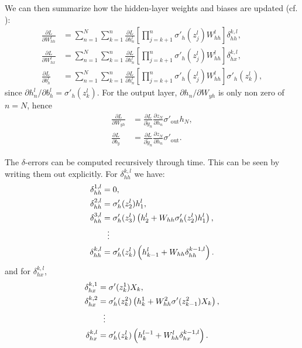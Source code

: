 \documentclass[%
reprint,
amsmath,amssymb,
aps,
]{revtex4-2}
\begin{document}
We can then summarize how the hidden-layer weights and biases are updated (cf. \cite{superGood}):
\begin{subequations}	\label{eq:gradients_hidden}
	\begin{align}
		\frac{\partial L}{\partial W_{hh}^{l}} &= \sum_{n=1}^{N}\sum_{k=1}^{n}\frac{\partial L}{\partial h_{n}^{l}}  \left[ \prod_{j=k+1}^{n} \sigma'_{h}(z_{j}^{l})W_{hh}^{l}\right] \delta^{k,l}_{hh}, \\
		\frac{\partial L}{\partial W_{hx}^{l}} &= \sum_{n=1}^{N}\sum_{k=1}^{n}\frac{\partial L}{\partial h_{n}^{l}}  \left[ \prod_{j=k+1}^{n} \sigma'_{h}(z_{j}^{l})W_{hh}^{l}\right] \delta^{k,l}_{hx}, \\
		\frac{\partial L}{\partial b_{h}^{l}} &= \sum_{n=1}^{N}\sum_{k=1}^{n}\frac{\partial L}{\partial h_{n}^{l}}  \left[ \prod_{j=k+1}^{n} \sigma'_{h}(z_{j}^{l})W_{hh}^{l}\right] \sigma'_{h}(z_k^l),
	\end{align}
\end{subequations}
since \(\partial h^{l}_{n}/\partial b_{h}^{l} = \sigma'_{h}(z_k^l)\). For the output layer, \(\partial h_n/\partial W_{yh}\) is only non zero of \(n=N\), hence
\begin{subequations}	\label{eq:gradients_out}
	\begin{align}
		\frac{\partial L}{\partial W_{yh}} &= \frac{\partial L}{\partial \tilde{y}_{n}} \frac{\partial z_N}{\partial h_{n}} \sigma'_{\text{out}} h_{N}, \\
		\frac{\partial L}{\partial b_{y}} &= \frac{\partial L}{\partial \tilde{y}_{n}} \frac{\partial z_N}{\partial h_{n}} \sigma'_{\text{out}}.
	\end{align}
\end{subequations}

The \(\delta\)-errors can be computed recursively through time. This can be seen by writing them out explicitly. For \(\delta^{k,l}_{hh}\) we have: 
\begin{align}
	\delta^{1,l}_{hh} &= 0, \notag\\
	\delta^{2,l}_{hh} &= \sigma'_{h}(z_2^{l}) h_1^{l},  \notag\\
	\delta^{3,l}_{hh} &= \sigma'_{h}(z_3^{l}) \left( h_2^{l} + W_{hh}\sigma'_{h}(z_2^{l})h_1^{l} \right), \\
	&\ \ \vdots \notag \\
	\delta^{k,l}_{hh} &= \sigma'_{h}(z_{k}^{l}) \left( h_{k-1}^{l} + W_{hh}\delta^{k-1,l}_{hh}\right).
\end{align}
and for \(\delta^{k,l}_{hx}\),
\begin{align}
	\delta^{k,1}_{hx} &= \sigma'(z_{k}^{1})X_{k}, \notag\\
	\delta^{k,2}_{hx} &= \sigma'_{h}(z_{k}^{2}) \left( h_{k}^{1} + W^{2}_{hh}\sigma'(z_{k-1}^{2})X_{k} \right),  \notag\\
	&\ \ \vdots \notag \\
	\delta^{k,l}_{hx} &= \sigma'_{h}(z_{k}^{l}) \left( h_{k}^{l-1} + W_{hh}^{l}\delta^{k-1,l}_{hx}\right).
\end{align}
\end{document}
